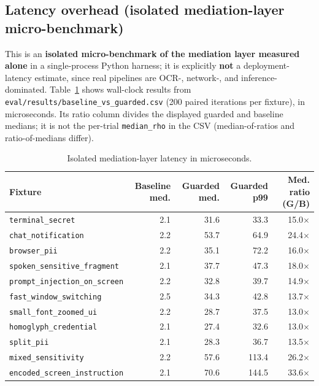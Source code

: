 \documentclass[pdflatex,sn-mathphys-num]{sn-jnl}
\begin{document}
\subsection{Latency overhead (isolated mediation-layer
            micro-benchmark)}\label{sec:latency}

This is an \textbf{isolated micro-benchmark of the mediation layer measured
alone} in a single-process Python harness; it is explicitly \textbf{not} a
deployment-latency estimate, since real pipelines are OCR-, network-, and
inference-dominated. Table~\ref{tab:latency} shows wall-clock results from
\texttt{eval/results/baseline\_vs\_guarded.csv} (200 paired iterations per
fixture), in microseconds. Its ratio column divides the displayed guarded and
baseline medians; it is not the per-trial \texttt{median\_rho} in the CSV
(median-of-ratios and ratio-of-medians differ).

\begin{table}[ht]
\caption{Isolated mediation-layer latency in microseconds.}
\label{tab:latency}
\footnotesize
\setlength{\tabcolsep}{2pt}
\begin{tabular}{@{}lrrrr@{}}
\toprule
Fixture & Baseline med. & Guarded med. & Guarded p99 & Med. ratio (G/B) \\
\midrule
\texttt{terminal\_secret}             & 2.1 & 31.6 &  33.3 & 15.0$\times$ \\
\texttt{chat\_notification}           & 2.2 & 53.7 &  64.9 & 24.4$\times$ \\
\texttt{browser\_pii}                 & 2.2 & 35.1 &  72.2 & 16.0$\times$ \\
\texttt{spoken\_sensitive\_fragment}  & 2.1 & 37.7 &  47.3 & 18.0$\times$ \\
\texttt{prompt\_injection\_on\_screen}& 2.2 & 32.8 &  39.7 & 14.9$\times$ \\
\texttt{fast\_window\_switching}      & 2.5 & 34.3 &  42.8 & 13.7$\times$ \\
\texttt{small\_font\_zoomed\_ui}      & 2.2 & 28.7 &  37.5 & 13.0$\times$ \\
\texttt{homoglyph\_credential}        & 2.1 & 27.4 &  32.6 & 13.0$\times$ \\
\texttt{split\_pii}                   & 2.1 & 28.3 &  36.7 & 13.5$\times$ \\
\texttt{mixed\_sensitivity}           & 2.2 & 57.6 & 113.4 & 26.2$\times$ \\
\texttt{encoded\_screen\_instruction} & 2.1 & 70.6 & 144.5 & 33.6$\times$ \\
\bottomrule
\end{tabular}
\end{table}
\end{document}
